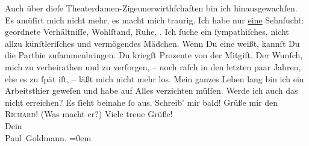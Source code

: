 \begin{ledgroupsized}[t]{13cm}
           \pstart
           Auch über dieſe Theaterdamen-Zigeunerwirthſchaften bin ich hinausgewachſen. Es
               amüſirt mich nicht mehr\textcolor{gray}{,} es macht mich \strikeout{\textcolor{gray}{trau}} traurig. {\pb}Ich habe nur \uline{eine} Sehnſucht: geordnete Verhältniſſe, Wohlſtand, Ruhe, \label{K_L02903-3v}\label{K_L02903-3h}. Ich ſuche ein
               ſympathiſches, nicht allzu künſtleriſches und vermögendes Mädchen. Wenn Du eine
               weißt, kannſt Du die Parthie zuſammenbringen. Du kriegſt Prozente von der
               Mitgift.\pend
           \pstart
           Der Wunſch, mich zu verheirathen und zu verſorgen, – noch raſch in den letzten paar
               Jahren, ehe es zu ſpät iſt, – läßt mich nicht mehr los. Mein ganzes Leben lang bin
               ich ein Arbeitsthier geweſen und habe auf Alles verzichten müſſen. Werde ich auch das
               nicht erreichen? Es ſieht {\pb}beinahe ſo aus.\pend
           \pstart
           Schreib’ mir bald!\pend
           \pstart
           Grüße mir den \textsc{Richard}! (Was macht er?)\pend
           \pstart
           Viele treue Grüße! {\\[\baselineskip]}Dein {\\[\baselineskip]}\spacefill\mbox{Paul Goldmann.}\pend
           \leftskip=0em{}
         
         \endnumbering{}\end{ledgroupsized}  \newcommand{\dateiname}{L02903}\newcommand{\titel}{Paul Goldmann an Arthur Schnitzler, 23. 1. [1900]}\newcommand{\editorInnen}{Martin Anton Müller und Laura Untner}
      
